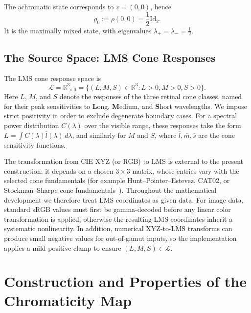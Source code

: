 \documentclass[11pt]{article}
\theoremstyle{plain}
\theoremstyle{definition}
\theoremstyle{remark}
\newcommand{\R}{\mathbb{R}}
\newcommand{\Rpp}{\mathbb{R}_{> 0}}     %
\newcommand{\Id}{\mathrm{Id}}
\begin{document}
The achromatic state corresponds to $v = (0,0)$, hence
\begin{equation}
\rho_0 := \rho(0,0) = \frac{1}{2}\Id_2.
\end{equation}
It is the maximally mixed state, with eigenvalues $\lambda_+ = \lambda_- = \frac{1}{2}$.

\subsection{The Source Space: LMS Cone Responses}
\label{sec:source}

The LMS cone response space is
\begin{equation}
\mathcal{L} = \Rpp^3 = \{ (L, M, S) \in \R^3 : L > 0, M > 0, S > 0 \}.
\end{equation}
Here $L$, $M$, and $S$ denote the responses of the three retinal cone classes, named for their peak sensitivities to \textbf{L}ong, \textbf{M}edium, and \textbf{S}hort wavelengths. We impose strict positivity in order to exclude degenerate boundary cases. For a spectral power distribution $C(\lambda)$ over the visible range, these responses take the form $L = \int C(\lambda) \bar{l}(\lambda) \, d\lambda$, and similarly for $M$ and $S$, where $\bar{l}, \bar{m}, \bar{s}$ are the cone sensitivity functions.

The transformation from CIE XYZ (or RGB) to LMS is external to the present construction: it depends on a chosen $3 \times 3$ matrix, whose entries vary with the selected cone fundamentals (for example Hunt--Pointer--Estevez, CAT02, or Stockman--Sharpe cone fundamentals~\cite{StockmanSharpe2000}). Throughout the mathematical development we therefore treat LMS coordinates as given data. For image data, standard sRGB values must first be gamma-decoded before any linear color transformation is applied; otherwise the resulting LMS coordinates inherit a systematic nonlinearity. In addition, numerical XYZ-to-LMS transforms can produce small negative values for out-of-gamut inputs, so the implementation applies a mild positive clamp to ensure $(L, M, S) \in \mathcal{L}$.

\section{Construction and Properties of the Chromaticity Map}
\label{sec:construction-properties}
\end{document}
